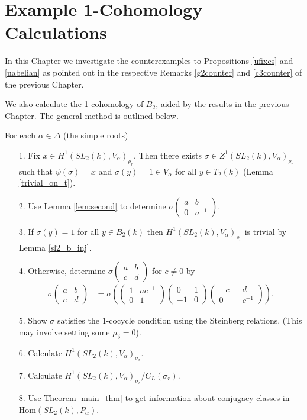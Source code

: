 
\chapter{Example 1-Cohomology Calculations}
\label{Chapter6}
In this Chapter we investigate the counterexamples to Propositions \ref{ufixes} and \ref{uabelian} as pointed out in the respective Remarks \ref{g2counter} and \ref{c3counter} of the previous Chapter.

We also calculate the 1-cohomology of $B_2$, aided by the results in the previous Chapter. The general method is outlined below.

For each $\alpha \in \Delta$ (the simple roots)
	\begin{itemize}
	\item[1.] Fix $x\in H^1(SL_2(k), V_\alpha)_{\rho_r}$. Then there exists $\sigma\in Z^1(SL_2(k), V_\alpha)_{\rho_r}$ such that $\psi(\sigma) = x$ and $\sigma\left(y\right) = 1 \in V_\alpha$ for all $y\in T_2(k)$ (Lemma \ref{trivial_on_t}).
	\item[2.] Use Lemma \ref{lem:second} to determine $\sigma\left(\begin{matrix}a & b\\0 & a^{-1}\end{matrix}\right)$. 
	\item[3.] If $\sigma\left(y\right) = 1$ for all $y\in B_2(k)$ then $H^1(SL_2(k), V_\alpha)_{\rho_r}$ is trivial by Lemma \ref{sl2_b_inj}.
	\item[4.] Otherwise, determine $\sigma\left(\begin{matrix}a & b\\c & d\end{matrix}\right)$ for $c \neq 0$ by
	\begin{align*}
	\sigma\left(\begin{matrix}a & b\\c & d\end{matrix}\right) &= \sigma\left(
			\left(\begin{matrix}1 & ac^{-1}\\0 & 1\end{matrix}\right)
			\left(\begin{matrix}0 & 1\\-1 & 0\end{matrix}\right)
			\left(\begin{matrix}-c & -d\\0 & -c^{-1}\end{matrix}\right)
			\right).
	\end{align*}
	\item[5.] Show $\sigma$ satisfies the 1-cocycle condition using the Steinberg relations. (This may involve setting some $\mu_\delta=0$).
	\item[6.] Calculate $H^1(SL_2(k), V_\alpha)_{\sigma_r}$.
	\item[7.] Calculate $H^1(SL_2(k), V_\alpha)_{\sigma_r}/C_L(\sigma_r)$.
	\item[8.] Use Theorem \ref{main_thm} to get information about conjugacy classes in $\mathrm{Hom}(SL_2(k), P_\alpha)$.
	\end{itemize}
